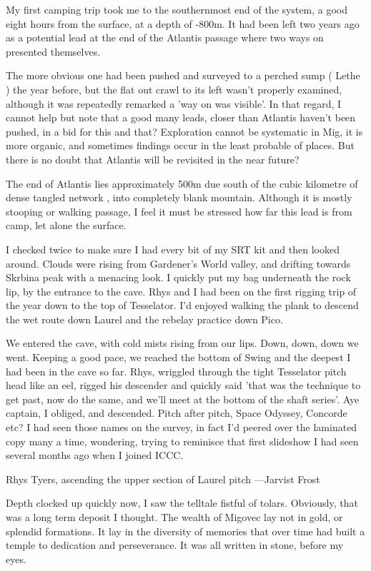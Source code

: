 My first camping trip took me to the southernmost end of the system, a good eight hours from the surface, at a depth of -800m. It had been left two years ago as a potential lead at the end of the Atlantis passage where two ways on presented themselves. 



The more obvious one had been pushed and surveyed to a perched sump ( Lethe ) the year before, but the flat out crawl to its left wasn't properly examined, although it was repeatedly remarked a 'way on was visible'. In that regard, I cannot help but note that a good many leads, closer than Atlantis haven't been pushed, in a bid for this and that? Exploration cannot be systematic in Mig, it is more organic, and sometimes findings occur in the least probable of places. But there is no doubt that Atlantis will be revisited in the near future?


The end of Atlantis lies approximately 500m due south of the cubic kilometre of dense tangled network , into completely blank mountain. Although it is mostly stooping or walking passage, I feel it must be stressed how far this lead is from camp, let alone the surface.

I checked twice to make sure I had every bit of my SRT kit and then looked around. Clouds were rising from Gardener's World valley, and drifting towards Skrbina peak with a menacing look. I quickly put my bag underneath the rock lip, by the entrance to the cave. Rhys and I had been on the first rigging trip of the year down to the top of Tesselator. I'd enjoyed walking the plank to descend the wet route down Laurel and the rebelay practice down Pico.

We entered the cave, with cold mists rising from our lips. Down, down, down we went. Keeping a good pace, we reached the bottom of Swing and the deepest I had been in the cave so far. Rhys, wriggled through the tight Tesselator pitch head like an eel, rigged his descender and quickly said 'that was the technique to get past, now do the same, and we'll meet at the bottom of the shaft series'. Aye captain, I obliged, and descended. Pitch after pitch, Space Odyssey, Concorde etc? I had seen those names on the survey, in fact I'd peered over the laminated copy many a time, wondering, trying to reminisce that first slideshow I had seen several months ago when I joined ICCC. 


\begin{marginfigure}
\checkoddpage \ifoddpage \forcerectofloat \else \forceversofloat \fi
\centering
 \caption{Rhys Tyers, ascending the upper section of Laurel pitch ---Jarvist Frost}
 \label{Laurel-up}
\end{marginfigure}
Depth clocked up quickly now, I saw the telltale fistful of tolars. Obviously, that was a long term deposit I thought. The wealth of Migovec lay not in gold, or splendid formations. It lay in the diversity of memories that over time had built a temple to dedication and perseverance. It was all written in stone, before my eyes.

